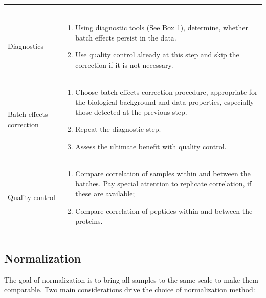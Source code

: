 \documentclass[num-refs]{wiley-article}
\begin{document}
\begin{table}[hbt]
\begin{tcolorbox}
\begin{tabular}{>{\raggedright}p{2cm}m{10.5cm}}
\begin{enumerate}
			\end{enumerate} \\ 
			Diagnostics		& \begin{enumerate}
				
				\item Using diagnostic tools (See \hyperref[box:Box1_definitions]{Box 1}), determine, whether batch effects persist in the data. 
				\item Use quality control already at this step and skip the correction if it is not necessary. 
				
			\end{enumerate} \\ 
			Batch effects correction	& 	\begin{enumerate}
				\item	Choose batch effects correction procedure, appropriate for the biological background and data properties, especially those detected at the previous step.
			\item	Repeat the diagnostic step.
			\item	Assess the ultimate benefit with quality control.
\end{enumerate} \\ 

			Quality control 	& 	\begin{enumerate}
				
				\item	Compare correlation of samples within and between the batches. Pay special attention to replicate correlation, if these are available;
				\item	Compare correlation of peptides within and between the proteins.	
			\end{enumerate} \\ 
		\end{tabular}
		
	\end{tcolorbox}
\end{table}
\clearpage

 



\subsection{Normalization}

The goal of normalization is to bring all samples to the same scale to make them comparable. Two main considerations drive the choice of normalization method: 
\end{document}
